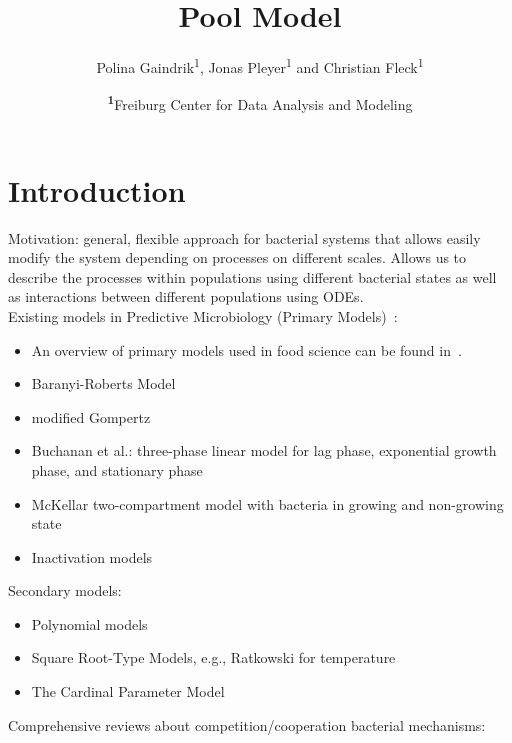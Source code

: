 \documentclass[10pt,A4paper]{article}
\title{Pool Model}
\author{
    Polina Gaindrik\textsuperscript{1},
    Jonas Pleyer\textsuperscript{1}
    and Christian Fleck\textsuperscript{1}
}
\date{
    \footnotesize
    \textsuperscript{\textbf{1}}Freiburg Center for Data Analysis and Modeling
}
\numberwithin{equation}{section}
\begin{document}
\maketitle

\tableofcontents

\newpage
%
%
%
%
\section{Introduction}
Motivation: general, flexible approach for bacterial systems that allows easily modify the system depending on processes on different scales.
Allows us to describe the processes within populations using different bacterial states as well as interactions between different populations using ODEs.\\
%
%
Existing models in Predictive Microbiology (Primary Models)~\cite{perez-rodriguez_predictive_2012}:
\begin{itemize}
    \item An overview of primary models used in food science can be found in~\cite{van_boekel_kinetic_2008}.
    \item Baranyi-Roberts Model~\cite{baranyi_modeling_1993, baranyi_dynamic_1994}
    \item modified Gompertz
    \item Buchanan et al.: three-phase linear model for lag phase, exponential growth phase, and stationary phase~\cite{buchanan_when_1997}
    \item McKellar two-compartment model with bacteria in growing and non-growing state~\cite{mckellar_heterogeneous_1997}
    \item Inactivation models
\end{itemize}
%
Secondary models:
\begin{itemize}
    \item Polynomial models 
    \item Square Root-Type Models, e.g., Ratkowski for temperature~\cite{ratkowsky_relationship_1982}
    \item The Cardinal Parameter Model~\cite{zwietering_decision_1992}
\end{itemize}
%
%
Comprehensive reviews about competition/cooperation bacterial mechanisms: \cite{ghoul_ecology_2016, stubbendieck_bacterial_2016, hibbing_bacterial_2010, west_social_2007}\\
%
%
%
\end{document}
